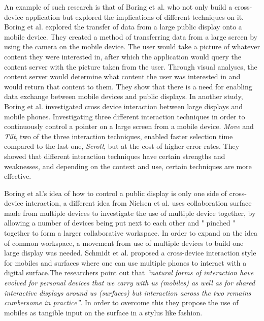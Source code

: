 An example of such research is that of Boring et al. \cite{Boring:2007} who not only build a cross-device application but explored the implications of different techniques on it. Boring et al. explored the transfer of data from a large public display onto a mobile device.
They created a method of transferring data from a large screen by using the camera on the mobile device.
The user would take a picture of whatever content they were interested in, after which the application would query the content server with the picture taken from the user.
Through visual analyses, the content server would determine what content the user was interested in and would return that content to them.
They show that there is a need for enabling data exchange between mobile devices and public displays.
In another study, Boring et al. \cite{Boring:2009} investigated cross device interaction between large displays and mobile phones.
Investigating three different interaction techniques in order to continuously control a pointer on a large screen from a mobile device.
\emph{Move} and \emph{Tilt}, two of the three interaction techniques, enabled faster selection time compared to the last one, \emph{Scroll}, but at the cost of higher error rates.
They showed that different interaction techniques have certain strengths and weaknesses, and depending on the context and use, certain techniques are more effective.

Boring et al.'s idea \cite{Boring:2009} of how to control a public display is only one side of cross-device interaction, a different idea from Nielsen et al. \cite{Nielsen:2014} uses collaboration surface made from multiple devices to investigate the  use of multiple device together, by allowing a number of devices being put next to each other and " pinched " together to form a larger collaborative workspace. In order to expand on the idea of common workspace, a movement from use of multiple devices to build one large display was needed. Schmidt et al. \cite{Schmidt:2012} proposed a cross-device interaction style for mobiles and surfaces where one can use multiple phones to interact with a digital surface.The researchers point out that \emph{``natural forms of interaction have evolved for personal devices that we carry with us (mobiles) as well as for shared interactive displays around us (surfaces) but interaction across the two remains cumbersome in practice''}. In order to overcome this they propose the use of mobiles as tangible input on the surface in a stylus like fashion.

